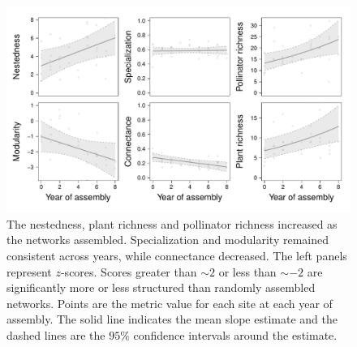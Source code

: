 \documentclass[12pt]{article}
\begin{document}
\begin{figure}
  \centering
  \includegraphics[width=1\textwidth]{../analysis/networkLevel/figures/baci.pdf}
  \caption{The nestedness, plant richness and pollinator richness
    increased as the networks assembled. Specialization and modularity
    remained consistent across years, while connectance decreased. The
    left panels represent $z$-scores. Scores greater than $\sim 2$ or
    less than $\sim -2$ are significantly more or less structured than
    randomly assembled networks. Points are the metric value for each
    site at each year of assembly. The solid line indicates the mean
    slope estimate and the dashed lines are the $95\%$ confidence
    intervals around the estimate.}
  \label{fig:baci}
\end{figure}
\clearpage
\end{document}
